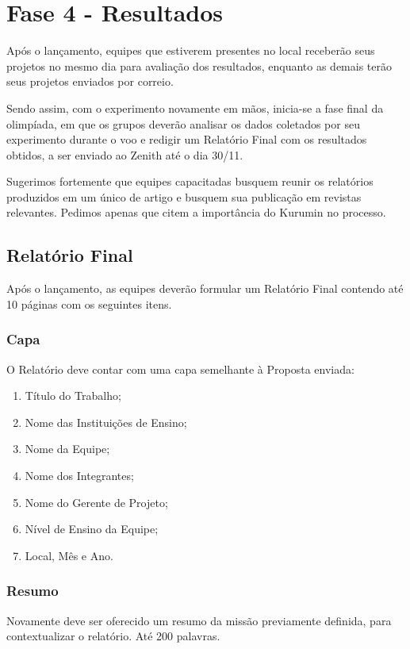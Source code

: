 \section{Fase 4 - Resultados}
    Após o lançamento, equipes que estiverem presentes no local receberão seus projetos no mesmo dia para avaliação dos resultados, enquanto as demais terão seus projetos enviados por correio.

    Sendo assim, com o experimento novamente em mãos, inicia-se a fase final da olimpíada, em que os grupos deverão analisar os dados coletados por seu experimento durante o voo e redigir um Relatório Final com os resultados obtidos, a ser enviado ao Zenith até o dia 30/11.

    Sugerimos fortemente que equipes capacitadas busquem reunir os relatórios produzidos em um único de artigo e busquem sua publicação em revistas relevantes. Pedimos apenas que citem a importância do Kurumin no processo.
    
    \subsection{Relatório Final}
        Após o lançamento, as equipes deverão formular um Relatório Final contendo até 10 páginas com os seguintes itens.

        \subsubsection{Capa}
            O Relatório deve contar com uma capa semelhante à Proposta enviada:
            \begin{enumerate}
                \item Título do Trabalho; 
                \item Nome das Instituições de Ensino; 
                \item Nome da Equipe; 
                \item Nome dos Integrantes; 
                \item Nome do Gerente de Projeto;
                \item Nível de Ensino da Equipe;
                \item Local, Mês e Ano. 
            \end{enumerate}
            
        \subsubsection{Resumo}
            Novamente deve ser oferecido um resumo da missão previamente definida, para contextualizar o relatório. Até 200 palavras.
        
